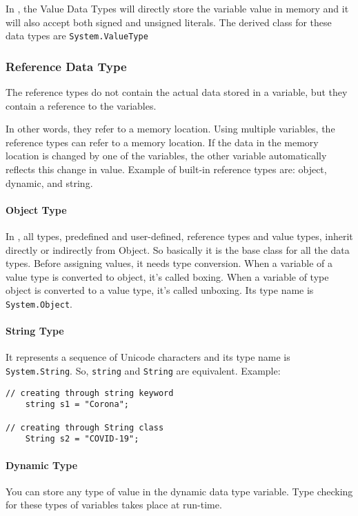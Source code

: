 	In {\cs}, the Value Data Types will directly store the variable value in memory and it will also accept both signed and unsigned literals. The derived class for these data types are \verb|System.ValueType|


	\subsubsection*{ Reference Data Type}

	The reference types do not contain the actual data stored in a variable, but they contain a reference to the variables.

	In other words, they refer to a memory location. Using multiple variables, the reference types can refer to a memory location. If the data in the memory location is changed by one of the variables, the other variable automatically reflects this change in value. Example of built-in reference types are: object, dynamic, and string.

		\paragraph*{Object Type}

		In {\cs}, all types, predefined and user-defined, reference types and value types, inherit directly or indirectly from Object. So basically it is the base class for all the data types. Before assigning values, it needs type conversion. When a variable of a value type is converted to object, it’s called boxing. When a variable of type object is converted to a value type, it’s called unboxing. Its type name is \verb|System.Object|.


\paragraph*{String Type}
It represents a sequence of Unicode characters and its type name is \texttt{System.String}. So, \texttt{string} and \texttt{String} are equivalent. Example:
		\begin{lstlisting}
// creating through string keyword
	string s1 = "Corona";

// creating through String class
	String s2 = "COVID-19";
\end{lstlisting}

 \paragraph*{Dynamic Type}
	You can store any type of value in the dynamic data type variable. Type checking for these types of variables takes place at run-time.


